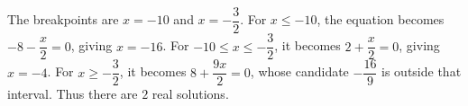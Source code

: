 The breakpoints are $x=-10$ and $x=-\dfrac{3}{2}$. For $x\le-10$, the equation becomes $-8-\dfrac{x}{2}=0$, giving $x=-16$. For $-10\le x\le-\dfrac{3}{2}$, it becomes $2+\dfrac{x}{2}=0$, giving $x=-4$. For $x\ge-\dfrac{3}{2}$, it becomes $8+\dfrac{9x}{2}=0$, whose candidate $-\dfrac{16}{9}$ is outside that interval. Thus there are $\boxed2$ real solutions.
